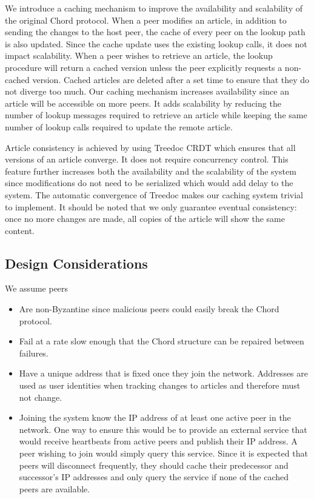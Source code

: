\documentclass[twocolumn]{article}
\begin{document}
We introduce a caching mechanism to improve the availability and scalability of the original Chord protocol. When a peer modifies an article, in addition to sending the changes to the host peer, the cache of every peer on the lookup path is also updated. Since the cache update uses the existing lookup calls, it does not impact scalability. When a peer wishes to retrieve an article, the lookup procedure will return a cached version unless the peer explicitly requests a non-cached version. Cached articles are deleted after a set time to ensure that they do not diverge too much. Our caching mechanism increases availability since an article will be accessible on more peers. It adds scalability by reducing the number of lookup messages required to retrieve an article while keeping the same number of lookup calls required to update the remote article.

Article consistency is achieved by using Treedoc CRDT which ensures that all versions of an article converge. It does not require concurrency control. This feature further increases both the availability and the scalability of the system since modifications do not need to be serialized which would add delay to the system. The automatic convergence of Treedoc makes our caching system trivial to implement. It should be noted that we only guarantee eventual consistency: once no more changes are made, all copies of the article will show the same content.

\subsection{Design Considerations}
We assume peers
\begin{itemize}
  \item Are non-Byzantine since malicious peers could easily break the Chord protocol.
  \item Fail at a rate slow enough that the Chord structure can be repaired between failures.
  \item Have a unique address that is fixed once they join the network. Addresses are used as user identities when tracking changes to articles and therefore must not change.
  \item Joining the system know the IP address of at least one active peer in the network. One way to ensure this would be to provide an external service that would receive heartbeats from active peers and publish their IP address. A peer wishing to join would simply query this service. Since it is expected that peers will disconnect frequently, they should cache their predecessor and successor's IP addresses and only query the service if none of the cached peers are available.
\end{itemize}
\end{document}
